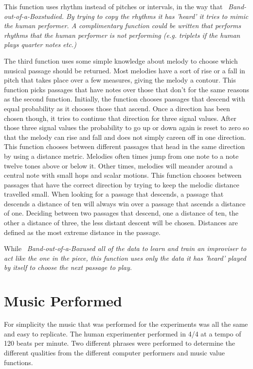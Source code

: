 \documentclass[12pt]{ucthesis}
\begin{document}
{This function uses rhythm instead of pitches or intervals, in the way that ~\em{Band-out-of-a-Box}\em studied. By trying to copy the rhythms it has 'heard' it tries to mimic the human performer. A complimentary function could be written that performs rhythms that the human performer is not performing (e.g. triplets if the human plays quarter notes etc.)

The third function uses some simple knowledge about melody to choose which musical passage should be returned. Most melodies have a sort of rise or a fall in pitch that takes place over a few measures, giving the melody a contour. This function picks passages that have notes over those that don't for the same reasons as the second function. Initially, the function chooses passages that descend with equal probability as it chooses those that ascend. Once a direction has been chosen though, it tries to continue that direction for three signal values. After those three signal values the probability to go up or down again is reset to zero so that the melody can rise and fall and does not simply careen off in one direction. This function chooses between different passages that head in the same direction by using a distance metric. Melodies often times jump from one note to a note twelve tones above or below it. Other times, melodies will meander around a central note with small hops and scalar motions. This function chooses between passages that have the correct direction by trying to keep the melodic distance travelled small. When looking for a passage that descends, a passage that descends a distance of ten will always win over a passage that ascends a distance of one. Deciding between two passages that descend, one a distance of ten, the other a distance of three, the less distant descent will be chosen. Distances are defined as the most extreme distance in the passage.

While ~\em{Band-out-of-a-Box}\em used all of the data to learn and train an improviser to act like the one in the piece, this function uses only the data it has 'heard' played by itself to choose the next passage to play. 

\section{Music Performed}
\label{music-performed}
For simplicity the music that was performed for the experiments was all the same and easy to replicate. The human experimenter performed in 4/4 at a tempo of 120 beats per minute. Two different phrases were performed to determine the different qualities from the different computer performers and music value functions. 

}
\end{document}
